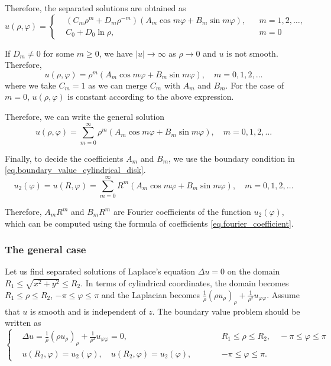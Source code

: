 Therefore, the separated solutions are obtained as
\begin{equation}
u(\rho, \varphi)=\left\{
\begin{aligned}
    &\left(C_m\rho^m + D_m\rho^{-m}\right)\left(A_m \cos m \varphi+B_m \sin m \varphi\right), && m=1,2, \ldots, 
    \\
    &C_0+D_0 \ln \rho, && m=0 
\end{aligned}
\right.
\end{equation}


If $D_m\neq 0$ for some $m\ge 0$, we have $|u| \rightarrow \infty$ as $\rho \rightarrow 0$ and $u$ is not smooth. Therefore,
$$
u(\rho, \varphi)=\rho^m\left(A_m \cos m \varphi+B_m \sin m \varphi\right), \quad m=0,1,2, \ldots
$$
where we take $C_m = 1$ as we can merge $C_m$ with $A_m$ and $B_m$. For the case of $m = 0$, $u(\rho, \varphi)$ is constant according to the above expression.

Therefore, we can write the general solution
$$
u(\rho, \varphi)=\sum_{m = 0}^\infty\rho^m\left(A_m \cos m \varphi+B_m \sin m \varphi\right), \quad m=0,1,2, \ldots
$$

Finally, to decide the coefficients $A_m$ and $B_m$, we use the boundary condition in \eqref{eq.boundary_value_cylindrical_disk}.
$$
u_2(\varphi) = u(R, \varphi)=\sum_{m = 0}^\infty R^m\left(A_m \cos m \varphi+B_m \sin m \varphi\right), \quad m=0,1,2, \ldots
$$

Therefore, $A_mR^m$ and $B_mR^m$ are Fourier coefficients of the function $u_2(\varphi)$, which can be computed using the formula of coefficients \eqref{eq.fourier_coefficient}. 

\subsubsection{The general case}
Let us find separated solutions of Laplace's equation $\Delta u = 0$ on the domain $R_1 \leq \sqrt{x^2+y^2} \leq R_2$. In terms of cylindrical coordinates, the domain becomes $R_1\le \rho \le R_2$, $-\pi \leq \varphi \leq \pi$ and the Laplacian becomes $\frac{1}{\rho} ( \rho u_\rho)_\rho + \frac{1}{\rho^2} u_{\varphi\varphi}$. Assume that $u$ is smooth and is independent of $z$. The boundary value problem should be written as
\begin{equation}\label{eq.boundary_value_cylindrical_annulus}
\left\{\begin{aligned}
    &\Delta u = \frac{1}{\rho} ( \rho u_\rho)_\rho + \frac{1}{\rho^2} u_{\varphi\varphi} = 0, \quad && R_1\le \rho \le R_2, \quad -\pi \leq \varphi \leq \pi
    \\
    &u(R_2, \varphi)=u_2(\varphi),\quad u(R_2, \varphi)=u_2(\varphi),\qquad && -\pi \leq \varphi \leq \pi. 
\end{aligned}\right.
\end{equation}

